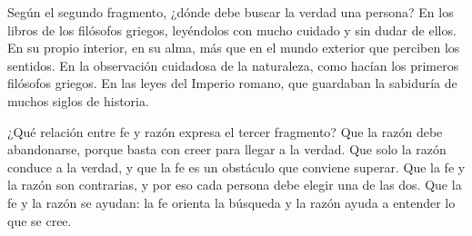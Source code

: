 \documentclass[carta,doscolumnas,compacta]{../plantilla/evaluacion}
\begin{document}
\begin{preguntas}
\begin{pregunta}[B]
Según el segundo fragmento, ¿dónde debe buscar la verdad una persona?
\opcioneslargas
  {En los libros de los filósofos griegos, leyéndolos con mucho cuidado y sin dudar de ellos.}
  {En su propio interior, en su alma, más que en el mundo exterior que perciben los sentidos.}
  {En la observación cuidadosa de la naturaleza, como hacían los primeros filósofos griegos.}
  {En las leyes del Imperio romano, que guardaban la sabiduría de muchos siglos de historia.}
\end{pregunta}

\begin{pregunta}[D]
¿Qué relación entre fe y razón expresa el tercer fragmento?
\opcioneslargas
  {Que la razón debe abandonarse, porque basta con creer para llegar a la verdad.}
  {Que solo la razón conduce a la verdad, y que la fe es un obstáculo que conviene superar.}
  {Que la fe y la razón son contrarias, y por eso cada persona debe elegir una de las dos.}
  {Que la fe y la razón se ayudan: la fe orienta la búsqueda y la razón ayuda a entender lo que se cree.}
\end{pregunta}


\end{preguntas}
\end{document}
